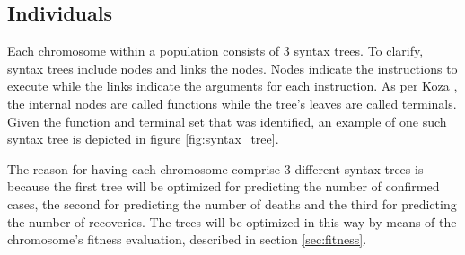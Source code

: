 \subsection{Individuals}\label{sec:individuals}
Each chromosome within a population consists of 3 syntax trees. To clarify, syntax trees include nodes and links the nodes. Nodes indicate the instructions to execute while the links indicate the arguments for each instruction. As per Koza \cite{koza1992genetic}, the internal nodes are called functions while the tree’s leaves are called terminals. Given the function and terminal set that was identified, an example of one such syntax tree is depicted in figure \ref{fig:syntax_tree}.

The reason for having each chromosome comprise 3 different syntax trees is because the first tree will be optimized for predicting the number of confirmed cases, the second for predicting the number of deaths and the third for predicting the number of recoveries. The trees will be optimized in this way by means of the chromosome's fitness evaluation, described in section \ref{sec:fitness}.

\setlength{\GapWidth}{1em}  
\thicklines {}   
\newcommand{\gpbox}[1]{\Ovalbox{#1\rule[-.7ex]{0ex}{2.7ex}}}

